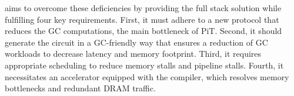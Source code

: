 \sysname aims to overcome these deficiencies by providing the full stack solution while fulfilling four key requirements. First, it must adhere to a new protocol that reduces the GC computations, the main bottleneck of PiT. Second, it should generate the circuit in a GC-friendly way that ensures a reduction of GC workloads to decrease latency and memory footprint. Third, it requires appropriate scheduling to reduce memory stalls and pipeline stalls. Fourth, it necessitates an accelerator equipped with the compiler, which resolves memory bottlenecks and redundant DRAM traffic.

